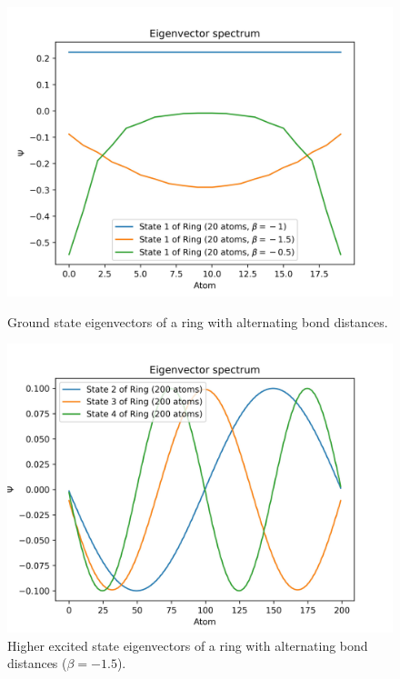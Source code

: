 \documentclass{article}
\begin{document}
\begin{figure}[h]
    \centering
    \begin{minipage}{0.47\textwidth}
        \centering
        \includegraphics[width=\textwidth]{Figures/ring_beta_eigenvectors.jpg}
        \caption{Ground state eigenvectors of a ring with alternating bond distances.}
        \label{fig:ring_alternating_beta_vec}
    \end{minipage}
    \hfill
    \begin{minipage}{0.47\textwidth}
        \centering
        \includegraphics[width=\textwidth]{Figures/ring_beta_eigenvectors_2.jpg}
        \caption{Higher excited state eigenvectors of a ring with alternating bond distances ($\beta = -1.5$).}
        \label{fig:ring_alternating_beta_vec_2}
    \end{minipage}
\end{figure}
\end{document}
